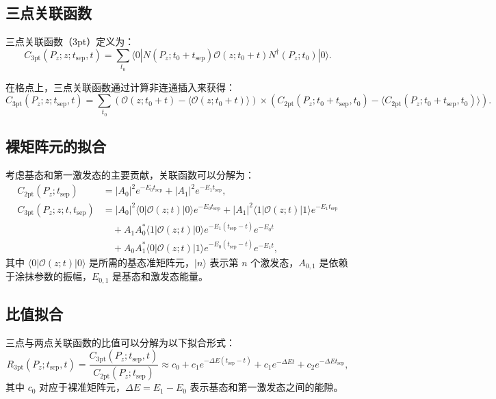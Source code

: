 \documentclass[11pt,a4paper]{article}
\newcommand{\tsep}{t_{\text{sep}}}
\newcommand{\Pz}{P_z}
\begin{document}
\subsection{三点关联函数}

三点关联函数（3pt）定义为：
\begin{equation}\label{eq:C3pt}
    C_{3\text{pt}}(\Pz; z; \tsep, t) = \sum_{t_0} \langle 0 | N(\Pz; t_0 + \tsep) \mathcal{O}(z; t_0 + t) N^\dagger(\Pz; t_0) | 0 \rangle.
\end{equation}

在格点上，三点关联函数通过计算非连通插入来获得：
\begin{equation}\label{eq:C3pt_disconnected}
    C_{3\text{pt}}(\Pz; z; \tsep, t) = \sum_{t_0} (\mathcal{O}(z; t_0 + t) - \langle \mathcal{O}(z; t_0 + t) \rangle) \times (C_{2\text{pt}}(\Pz; t_0 + \tsep, t_0) - \langle C_{2\text{pt}}(\Pz; t_0 + \tsep, t_0) \rangle).
\end{equation}

\subsection{裸矩阵元的拟合}

考虑基态和第一激发态的主要贡献，关联函数可以分解为：
\begin{align}
    C_{2\text{pt}}(\Pz; \tsep) &= |A_0|^2 e^{-E_0 \tsep} + |A_1|^2 e^{-E_1 \tsep}, \label{eq:C2pt_decomp}\\
    C_{3\text{pt}}(\Pz; z; t, \tsep) &= |A_0|^2 \langle 0 | \mathcal{O}(z;t) | 0 \rangle e^{-E_0 \tsep} + |A_1|^2 \langle 1 | \mathcal{O}(z;t) | 1 \rangle e^{-E_1 \tsep} \nonumber\\
    &\quad + A_1 A_0^* \langle 1 | \mathcal{O}(z;t) | 0 \rangle e^{-E_1(\tsep - t)} e^{-E_0 t} \nonumber\\
    &\quad + A_0 A_1^* \langle 0 | \mathcal{O}(z;t) | 1 \rangle e^{-E_0(\tsep - t)} e^{-E_1 t}, \label{eq:C3pt_decomp}
\end{align}
其中 $\langle 0 | \mathcal{O}(z;t) | 0 \rangle$ 是所需的基态准矩阵元，$|n\rangle$ 表示第 $n$ 个激发态，$A_{0,1}$ 是依赖于涂抹参数的振幅，$E_{0,1}$ 是基态和激发态能量。

\subsection{比值拟合}

三点与两点关联函数的比值可以分解为以下拟合形式：
\begin{equation}\label{eq:ratio_fit}
    R_{3\text{pt}}(\Pz; \tsep, t) = \frac{C_{3\text{pt}}(\Pz; \tsep, t)}{C_{2\text{pt}}(\Pz; \tsep)} \approx c_0 + c_1 e^{-\Delta E(\tsep - t)} + c_1 e^{-\Delta E t} + c_2 e^{-\Delta E \tsep},
\end{equation}
其中 $c_0$ 对应于裸准矩阵元，$\Delta E = E_1 - E_0$ 表示基态和第一激发态之间的能隙。
\end{document}
